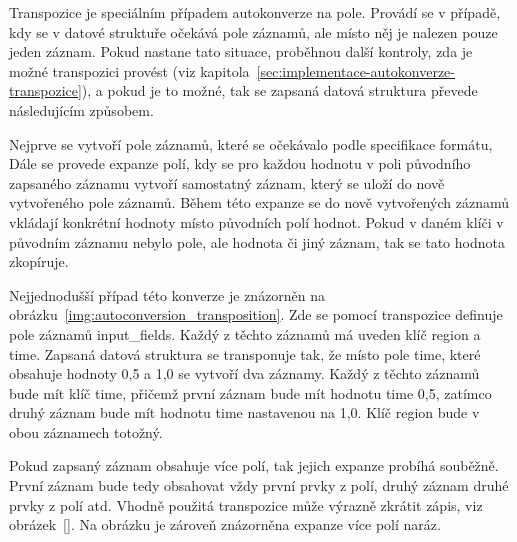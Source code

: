\documentclass[FM,bw,DP]{tulthesis}
\begin{document}
Transpozice je speciálním případem autokonverze na pole. Provádí se v případě, kdy se v datové struktuře očekává pole záznamů, ale místo něj je nalezen pouze jeden záznam. Pokud nastane tato situace, proběhnou další kontroly, zda je možné transpozici provést (viz kapitola~\ref{sec:implementace-autokonverze-transpozice}), a pokud je to možné, tak se zapsaná datová struktura převede následujícím způsobem.

Nejprve se vytvoří pole záznamů, které se očekávalo podle specifikace formátu, Dále se provede expanze polí, kdy se pro každou hodnotu v poli původního zapsaného záznamu vytvoří samostatný záznam, který se uloží do nově vytvořeného pole záznamů. Během této expanze se do nově vytvořených záznamů vkládají konkrétní hodnoty místo původních polí hodnot. Pokud v daném klíči v původním záznamu nebylo pole, ale hodnota či jiný záznam, tak se tato hodnota zkopíruje.

Nejjednodušší případ této konverze je znázorněn na obrázku~\ref{img:autoconversion_transposition}. Zde se pomocí transpozice definuje pole záznamů input\_fields. Každý z těchto záznamů má uveden klíč region a time. Zapsaná datová struktura se transponuje tak, že místo pole time, které obsahuje hodnoty 0,5 a 1,0 se vytvoří dva záznamy. Každý z těchto záznamů bude mít klíč time, přičemž první záznam bude mít hodnotu time 0,5, zatímco druhý záznam bude mít hodnotu time nastavenou na 1,0. Klíč region bude v obou záznamech totožný.

Pokud zapsaný záznam obsahuje více polí, tak jejich expanze probíhá souběžně. První záznam bude tedy obsahovat vždy první prvky z polí, druhý záznam druhé prvky z polí atd. Vhodně použitá transpozice může výrazně zkrátit zápis, viz obrázek~\ref{}. Na obrázku je zároveň znázorněna expanze více polí naráz.

\lstset{style=code}
\end{document}
